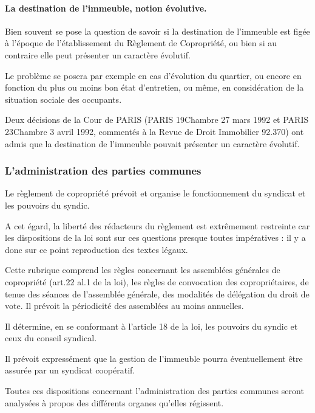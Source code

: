 			\paragraph{La destination de l'immeuble, notion évolutive.}
		
				Bien souvent se pose la question de savoir si la destination de l'immeuble est figée à l'époque de l'établissement du Règlement de Copropriété, ou bien si au contraire elle peut présenter un caractère évolutif.
				
				Le problème se posera par exemple en cas d'évolution du quartier, ou encore en fonction du plus ou moins bon état d'entretien, ou même, en considération de la situation sociale des occupants.
				
				Deux décisions de la Cour de PARIS (PARIS 19\degres Chambre 27 mars 1992 et PARIS 23\degres Chambre 3 avril 1992, commentés à la Revue de Droit Immobilier 92.370) ont admis que la destination de l'immeuble pouvait présenter un caractère évolutif.
		
		\subsubsection{L'administration des parties communes}

			Le règlement de copropriété prévoit et organise le fonctionnement du syndicat et les pouvoirs du syndic.
			
			A cet égard, la liberté des rédacteurs du règlement est extrêmement restreinte car les dispositions de la loi sont sur ces questions presque toutes impératives : il y a donc sur ce point reproduction des textes légaux.
			
			Cette rubrique comprend les règles concernant les assemblées générales de copropriété (art.22 al.1 de la loi), les règles de convocation des copropriétaires, de tenue des séances de l'assemblée générale, des modalités de délégation du droit de vote. Il prévoit la périodicité des assemblées au moins annuelles.
			
			Il détermine, en se conformant à l'article 18 de la loi, les pouvoirs du syndic et ceux du conseil syndical.
			
			Il prévoit expressément que la gestion de l'immeuble pourra éventuellement être assurée par un syndicat coopératif.
			
			Toutes ces dispositions concernant l'administration des parties communes seront analysées à propos des différents organes qu'elles régissent.
		
